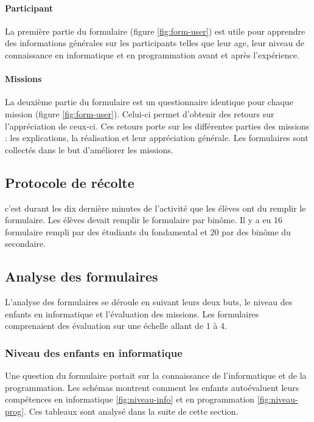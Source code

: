\paragraph{Participant}
La première partie du formulaire (figure \ref{fig:form-user}) est utile pour apprendre des informations générales sur les participants telles que leur age, leur niveau de connaissance en informatique et en programmation avant et après l'expérience.

\paragraph{Missions}
La deuxième partie du formulaire est un questionnaire identique pour chaque \gls{mission} (figure \ref{fig:form-user}). Celui-ci permet d'obtenir des retours sur l'appréciation de ceux-ci. Ces retours porte sur les différentes parties des \glspl{mission} : les explications, la réalisation et leur appréciation générale. Les formulaires sont collectés dans le but d'améliorer les \glspl{mission}.

\subsection{Protocole de récolte}
c'est durant les dix dernière minutes de l'activité que les élèves ont du remplir le formulaire. Les élèves devait remplir le formulaire par binôme. Il y a eu 16 formulaire rempli par des étudiants du \gls{fondamental} et 20 par des binôme du \gls{secondaire}.

\subsection{Analyse des formulaires}
L'analyse des formulaires se déroule en suivant leurs deux buts, le niveau des enfants en informatique et l'évaluation des \glspl{mission}. Les formulaires comprenaient des évaluation sur une échelle allant de 1 à 4.

\subsubsection{Niveau des enfants en informatique}
Une question du formulaire portait sur la connaissance de l'informatique et de la programmation. Les schémas montrent comment les enfants autoévaluent leurs compétences en informatique \ref{fig:niveau-info} et en programmation \ref{fig:niveau-prog}. Ces tableaux sont analysé dans la suite de cette section.

